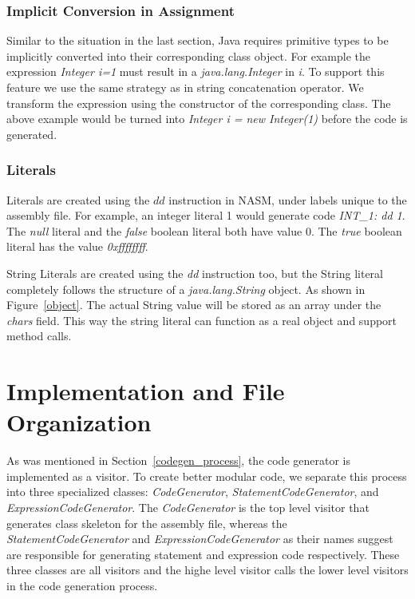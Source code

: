 \documentclass[a4paper, notitlepage]{report}
\begin{document}
\subsection{Implicit Conversion in Assignment}

Similar to the situation in the last section, Java requires primitive types to be implicitly converted into their corresponding class object. For example the expression \emph{Integer i=1} must result in a \emph{java.lang.Integer} in \emph{i}. To support this feature we use the same strategy as in string concatenation operator. We transform the expression using the constructor of the corresponding class. The above example would be turned into \emph{Integer i = new Integer(1)} before the code is generated.

\subsection{Literals}

Literals are created using the $dd$ instruction in NASM, under labels unique to the assembly file. For example, an integer literal 1 would generate code \emph{INT\_1: dd 1}. The \emph{null} literal and the \emph{false} boolean literal both have value 0. The \emph{true} boolean literal has the value \emph{0xffffffff}.

String Literals are created using the \emph{dd} instruction too, but the String literal completely follows the structure of a \emph{java.lang.String} object. As shown in Figure~\ref{object}. The actual String value will be stored as an array under the \emph{chars} field. This way the string literal can function as a real object and support method calls.

\chapter{Implementation and File Organization}
\label{implementation}

As was mentioned in Section~\ref{codegen_process}, the code generator is implemented as a visitor. To create better modular code, we separate this process into three specialized classes: \emph{CodeGenerator}, \emph{StatementCodeGenerator}, and \emph{ExpressionCodeGenerator}. The \emph{CodeGenerator} is the top level visitor that generates class skeleton for the assembly file, whereas the \emph{StatementCodeGenerator} and \emph{ExpressionCodeGenerator} as their names suggest are responsible for generating statement and expression code respectively. These three classes are all visitors and the highe level visitor calls the lower level visitors in the code generation process.
\end{document}
